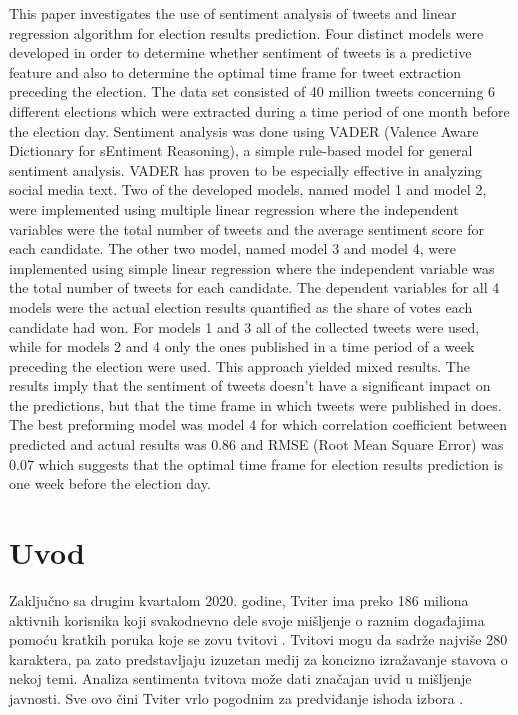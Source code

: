 \begin{AbstractEng}
This paper investigates the use of sentiment analysis of tweets and linear regression algorithm for election results prediction. Four distinct models were developed in order to determine whether sentiment of tweets is a predictive feature and also to determine the optimal time frame for tweet extraction preceding the election. The data set consisted of 40 million tweets concerning 6 different elections which were extracted during a time period of one month before the election day. Sentiment analysis was done using VADER (Valence Aware Dictionary for sEntiment Reasoning), a simple rule-based model for general sentiment analysis. VADER has proven to be especially effective in analyzing social media text. Two of the developed models, named model 1 and model 2, were implemented using multiple linear regression where the independent variables were the total number of tweets and the average sentiment score for each candidate. The other two model, named model 3 and model 4, were implemented using simple linear regression where the independent variable was the total number of tweets for each candidate. The dependent variables for all 4 models were the actual election results quantified as the share of votes each candidate had won. For models 1 and 3 all of the collected tweets were used, while for models 2 and 4 only the ones published in a time period of a week preceding the election were used. This approach yielded mixed results. The results imply that the sentiment of tweets doesn’t have a significant impact on the predictions, but that the time frame in which tweets were published in does. The best preforming model was model 4 for which correlation coefficient between predicted and actual results was 0.86 and RMSE (Root Mean Square Error) was 0.07 which suggests that the optimal time frame for election results prediction is one week before the election day.
\end{AbstractEng}

\StartDoublePaper
\label{rac.petra}

\section{Uvod}

Zaključno sa drugim kvartalom 2020. godine, Tviter ima preko 186 miliona aktivnih korisnika koji svakodnevno dele svoje mišljenje o raznim događajima pomoću kratkih poruka koje se zovu tvitovi \parencite{statista2020twitterusers}. Tvitovi mogu da sadrže najviše 280 karaktera, pa zato predstavljaju izuzetan medij za koncizno izražavanje stavova o nekoj temi. Analiza sentimenta tvitova može dati značajan uvid u mišljenje javnosti. Sve ovo čini Tviter vrlo pogodnim za predviđanje ishoda izbora \parencite{kursuncu2019predictive}. 

